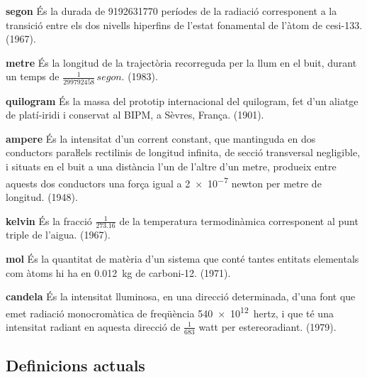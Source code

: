 \begin{list}{}
   {\setlength{\labelwidth}{22mm} \setlength{\leftmargin}{22mm} \setlength{\labelsep}{2mm}}
   \item[\textbf{segon}] És la durada de \num{9192631770} períodes de la
   radiació corresponent a la transició entre els dos nivells
  hiperfins de l'estat fonamental de l'àtom de cesi-133. (1967).
   \item[\textbf{metre}] És la longitud de la trajectòria recorreguda per la llum
   en el buit, durant un temps de $\frac{1}{\num{299792458}}\unit{\,segon}$. (1983).
   \item[\textbf{quilogram}] És la massa del prototip internacional del quilogram, fet d'un aliatge de platí-iridi i
    conservat al BIPM, a Sèvres, França. (1901).
   \item[\textbf{ampere}] És la intensitat d'un corrent constant,
   que mantinguda en dos conductors paraŀlels rectilinis de longitud
   infinita, de secció transversal negligible, i situats en el buit a una
   distància l'un de l'altre d'un metre, produeix entre
   aquests dos conductors  una força igual a \num{2e-7} newton per metre de longitud. (1948).
   \item[\textbf{kelvin}] És la fracció $\frac{1}{\num{273,16}}$ de la temperatura
   termodinàmica corresponent al punt triple de l'aigua. (1967).
   \item[\textbf{mol}] És la quantitat de matèria d'un sistema que conté tantes
   entitats elementals com àtoms hi ha en \qty{0,012}{kg} de carboni-12. (1971).
   \item[\textbf{candela}] És la intensitat lluminosa, en una direcció determinada,
   d'una font que emet radiació monocromàtica de freqüència \qty{540e12}{hertz}, i
   que té una intensitat radiant en aquesta direcció de $\frac{1}{683}$ watt per estereoradiant. (1979).
\end{list}

\subsection{Definicions actuals}

